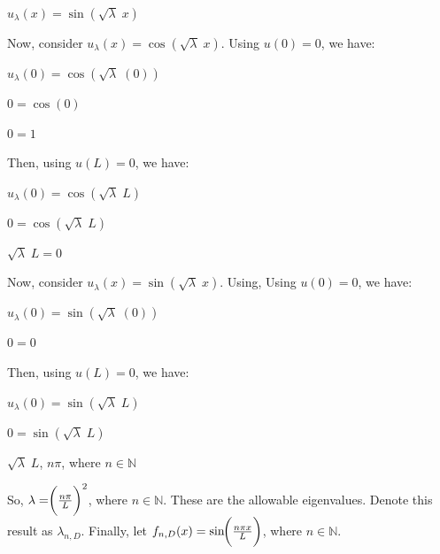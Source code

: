 \documentclass[12pt, executivepaper]{article}
\begin{document}
\begin{flushleft}
$u_{\lambda}(x)=\sin(\sqrt{\lambda} \; x)$

\vspace{3mm}

Now, consider $u_{\lambda}(x)=\cos(\sqrt{\lambda} \; x)$. Using $u(0)=0$, we have:

\begin{center}

$u_{\lambda}(0)=\cos(\sqrt{\lambda} \; (0))$

$0=\cos(0)$

$0=1$

\end{center}

\vspace{3mm}

Then, using $u(L)=0$, we have:

\begin{center}

$u_{\lambda}(0)=\cos(\sqrt{\lambda} \; L)$

$0=\cos(\sqrt{\lambda} \; L)$

$\sqrt{\lambda} \; L=0$

\end{center}

Now, consider $u_{\lambda}(x)=\sin(\sqrt{\lambda} \; x)$. Using, Using $u(0)=0$, we have:

\begin{center}

$u_{\lambda}(0)=\sin(\sqrt{\lambda} \; (0))$

$0=0$

\end{center}

\vspace{3mm}

Then, using $u(L)=0$, we have: 

\begin{center}

$u_{\lambda}(0)=\sin(\sqrt{\lambda} \; L)$

$0=\sin(\sqrt{\lambda} \; L)$

$\sqrt{\lambda} \; L$, $n\pi$, where $n \in \mathbb{N}$

\end{center}

\pagebreak

\vspace*{-40mm}

So, $\lambda= \hspace{-1mm} \bigg(\frac{n\pi}{L}\bigg)^2$, where $n \in \mathbb{N}$. These are the allowable eigenvalues. Denote this result as $\lambda_{n,D}$. Finally, let $f_{n,D}(x)=\sin \hspace{-1mm} \bigg(\frac{n \pi x}{L}\bigg)$, where $n \in \mathbb{N}$.


\end{flushleft}
\end{document}

